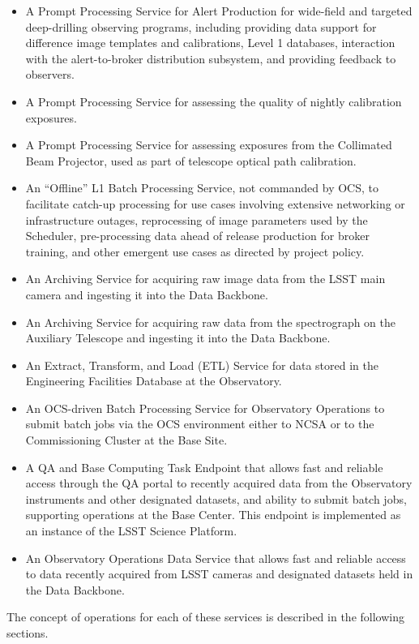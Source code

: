 \begin{itemize}
\item  A Prompt Processing Service for Alert Production for wide-field and 
targeted deep-drilling observing programs, including providing data support for 
difference image templates and calibrations, Level 1 databases, interaction with 
the alert-to-broker distribution subsystem, and providing feedback to observers.
\item  A Prompt Processing Service for assessing the quality of nightly 
calibration exposures.
\item  A Prompt Processing Service for assessing exposures from the Collimated 
Beam Projector, used as part of telescope optical path calibration.
\item  An “Offline” L1 Batch Processing Service, not commanded by OCS, to 
facilitate catch-up processing for use cases involving extensive networking or 
infrastructure outages, reprocessing of image parameters used by the Scheduler, 
pre-processing data ahead of release production for broker training, and other 
emergent use cases as directed by project policy.
\item  An Archiving Service for acquiring raw image data from the LSST main 
camera and ingesting it into the Data Backbone.
\item  An Archiving Service for acquiring raw data from the spectrograph on the 
Auxiliary Telescope and ingesting it into the Data Backbone.
\item  An Extract, Transform, and Load (ETL) Service for data stored in the 
Engineering Facilities Database at the Observatory.
\item  An OCS-driven Batch Processing Service for Observatory Operations to 
submit batch jobs via the OCS environment either to NCSA or to the Commissioning 
Cluster at the Base Site.
\item  A QA and Base Computing Task Endpoint that allows fast and reliable access 
through the QA portal to recently acquired data from the Observatory instruments 
and other designated datasets, and ability to submit batch jobs, supporting 
operations at the Base Center.  This endpoint is implemented as an instance of
the LSST Science Platform.
\item  An Observatory Operations Data Service that allows fast and reliable 
access to data recently acquired from LSST cameras and designated datasets held 
in the Data Backbone.
\end{itemize}

The concept of operations for each of these services is described in the 
following sections.


